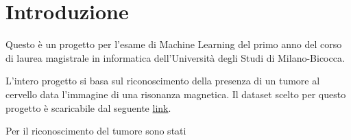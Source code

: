 \chapter{Introduzione}

Questo è un progetto per l'esame di Machine Learning del primo anno del corso 
di laurea magistrale in informatica dell'Università degli Studi di Milano-Bicocca.

L'intero progetto si basa sul riconoscimento della presenza di un tumore al cervello
data l'immagine di una risonanza magnetica. Il dataset scelto per questo progetto
è scaricabile dal seguente \href{URLhttps://www.kaggle.com/datasets/jakeshbohaju/brain-tumor/data}{link}.

Per il riconoscimento del tumore sono stati 